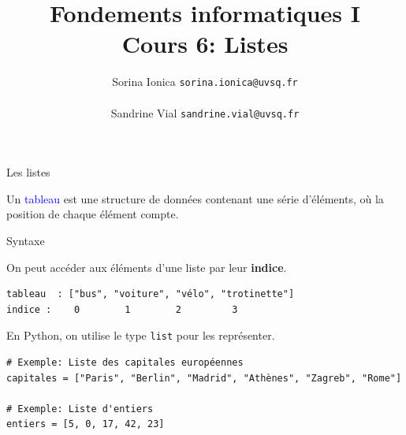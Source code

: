 \documentclass[10pt]{beamer}
\title[IN100 Cours 6]{\textbf{Fondements informatiques I}\\
Cours 6: Listes}
\author[]{Sorina Ionica \texttt{sorina.ionica@uvsq.fr} \\~\\Sandrine Vial  \texttt{sandrine.vial@uvsq.fr} }
\institute{}
\date{}
\begin{document}
\frame{\titlepage}


\begin{frame}[fragile]{Les listes}

Un \textcolor{blue}{tableau} est une structure de données contenant une série
d'éléments, où la position de chaque élément compte.\\

\begin{alertblock}{Syntaxe}

On peut accéder aux éléments d'une liste par leur \textbf{indice}.
\begin{verbatim}
tableau  : ["bus", "voiture", "vélo", "trotinette"]
indice :    0        1        2         3

\end{verbatim}
\end{alertblock}

\pause

\vspace{0.3 cm}
En Python, on utilise le type \texttt{\texttt{list}} pour les représenter. 

\begin{exampleblock}{}
\small{
\begin{verbatim}
# Exemple: Liste des capitales européennes
capitales = ["Paris", "Berlin", "Madrid", "Athènes", "Zagreb", "Rome"]

# Exemple: Liste d'entiers
entiers = [5, 0, 17, 42, 23]
\end{verbatim}
}
\end{exampleblock}
\end{frame}
\end{document}
